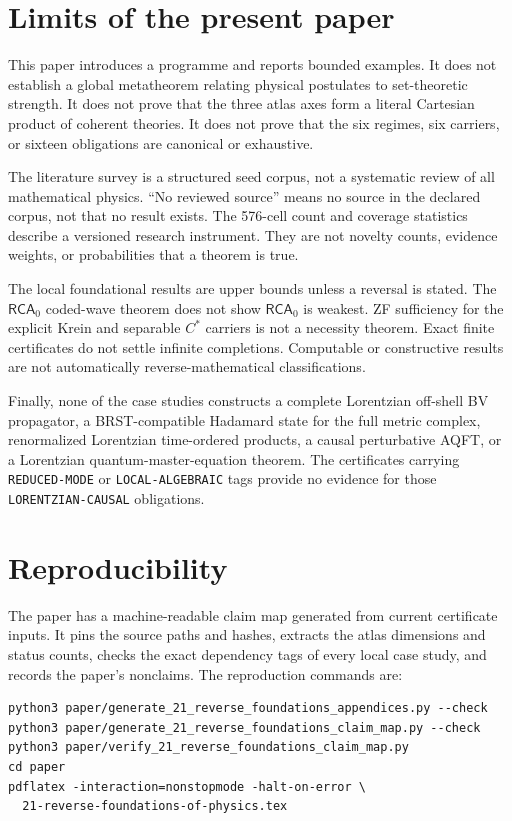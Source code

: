 \documentclass[11pt]{article}
\theoremstyle{definition}
\theoremstyle{remark}
\newcommand{\RCA}{\mathsf{RCA}_{0}}
\newcommand{\rtype}[1]{\nolinkurl{#1}}
\begin{document}
\section{Limits of the present paper}
\label{sec:limits}

This paper introduces a programme and reports bounded examples.  It does not
establish a global metatheorem relating physical postulates to set-theoretic
strength.  It does not prove that the three atlas axes form a literal
Cartesian product of coherent theories.  It does not prove that the six
regimes, six carriers, or sixteen obligations are canonical or exhaustive.

The literature survey is a structured seed corpus, not a systematic review of
all mathematical physics.  ``No reviewed source'' means no source in the
declared corpus, not that no result exists.  The 576-cell count and coverage
statistics describe a versioned research instrument.  They are not novelty
counts, evidence weights, or probabilities that a theorem is true.

The local foundational results are upper bounds unless a reversal is stated.
The \(\RCA\) coded-wave theorem does not show \(\RCA\) is weakest.  ZF
sufficiency for the explicit Krein and separable \(C^*\) carriers is not a
necessity theorem.  Exact finite certificates do not settle infinite
completions.  Computable or constructive results are not automatically
reverse-mathematical classifications.

Finally, none of the case studies constructs a complete Lorentzian off-shell
BV propagator, a BRST-compatible Hadamard state for the full metric complex,
renormalized Lorentzian time-ordered products, a causal perturbative AQFT, or a
Lorentzian quantum-master-equation theorem.  The certificates carrying
\rtype{REDUCED-MODE} or \rtype{LOCAL-ALGEBRAIC} tags provide no evidence for
those \rtype{LORENTZIAN-CAUSAL} obligations.

\section{Reproducibility}
\label{sec:reproducibility}

The paper has a machine-readable claim map generated from current certificate
inputs.  It pins the source paths and hashes, extracts the atlas dimensions
and status counts, checks the exact dependency tags of every local case study,
and records the paper's nonclaims.  The reproduction commands are:

\begin{verbatim}
python3 paper/generate_21_reverse_foundations_appendices.py --check
python3 paper/generate_21_reverse_foundations_claim_map.py --check
python3 paper/verify_21_reverse_foundations_claim_map.py
cd paper
pdflatex -interaction=nonstopmode -halt-on-error \
  21-reverse-foundations-of-physics.tex
\end{verbatim}
\end{document}
